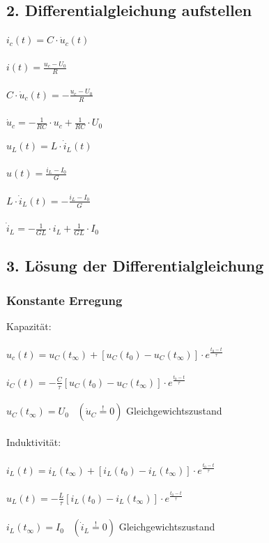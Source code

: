 \documentclass[a4paper,twocolumn,10pt]{article}
\newcommand{\sollsein}{\stackrel{!}{=}}
\begin{document}
\subsection*{2. Differentialgleichung aufstellen}
\begin{minipage}[t]{0.23\textwidth}
$i_c(t)=C\cdot \dot u_c(t)$\\\\
$i(t)=\frac{u_c-U_0}{R}$\\\\
$C\cdot \dot u_c(t)=-\frac{u_c-U_0}{R}$\\\\
\underline{$\dot u_c=-\frac{1}{RC}\cdot u_c+\frac{1}{RC}\cdot U_0$}
\end{minipage}
\hfill
\begin{minipage}[t]{0.23\textwidth}
$u_L(t)=L\cdot \dot i_L(t)$\\\\
$u(t)=\frac{i_L-I_0}{G}$\\\\
$L\cdot \dot i_L(t)=-\frac{i_L-I_0}{G}$\\\\
\underline{$\dot i_L=-\frac{1}{GL}\cdot i_L+\frac{1}{GL}\cdot I_0$}
\end{minipage}

\subsection*{3. Lösung der Differentialgleichung}
\subsubsection*{Konstante Erregung}
Kapazität:\\\\
\underline{$u_c(t)=u_C(t_{\infty})+[u_C(t_0)-u_C(t_{\infty})]\cdot e^{\frac{t_0-t}{\tau}}$}\\\\
$i_C(t)=-\frac{C}{\tau}[u_C(t_0)-u_C(t_{\infty})]\cdot e^{\frac{t_0-t}{\tau}}$\\\\
$u_C(t_{\infty})= U_0\;\;\;(\dot u_C\sollsein 0)$ Gleichgewichtszustand\\\\
Induktivität:\\\\
\underline{$i_L(t)=i_L(t_{\infty})+[i_L(t_0)-i_L(t_{\infty})]\cdot e^{\frac{t_0-t}{\tau}}$}\\\\
$u_L(t)=-\frac{L}{\tau}[i_L(t_0)-i_L(t_{\infty})]\cdot e^{\frac{t_0-t}{\tau}}$\\\\
$i_L(t_{\infty})= I_0\;\;\;(\dot i_L\sollsein 0)$ Gleichgewichtszustand
\end{document}
